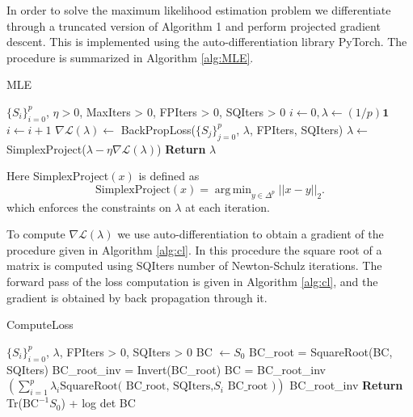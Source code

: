\documentclass[nohyperref]{article}
\DeclareMathOperator*{\argmin}{arg\,min}
\theoremstyle{definition}
\begin{document}
In order to solve the maximum likelihood estimation problem we differentiate through a truncated version of \citep{chewi2020gradient} Algorithm 1 and perform projected gradient descent. This is implemented using the auto-differentiation library PyTorch. The procedure is summarized in Algorithm \ref{alg:MLE}.
\begin{algorithm} 
\caption{MLE}\label{alg:MLE}
\begin{algorithmic}
 $\{S_i\}_{i=0}^p$, $\eta > 0$, MaxIters > 0, FPIters > 0, SQIters > 0 
\STATE $i \leftarrow 0, \lambda  \leftarrow (1/p)\bm{1}$
    \STATE $i \leftarrow i + 1$ 
    \STATE $\nabla \mathcal{L}(\lambda) \leftarrow $ BackPropLoss($\{S_j\}_{j=0}^p$, $\lambda$, FPIters, SQIters)
    \STATE $\lambda \leftarrow $ SimplexProject($\lambda - \eta \nabla \mathcal{L}(\lambda)$)
\ENDWHILE
\STATE \textbf{Return} $\lambda$
\end{algorithmic}
\end{algorithm}
Here SimplexProject$(x)$ is defined as 
$$\text{SimplexProject}(x) = \argmin_{y \in \Delta^p} ||x - y||_2.$$
which enforces the constraints on $\lambda$ at each iteration.

To compute $\nabla \mathcal{L}(\lambda)$ we use auto-differentiation to obtain a gradient of the procedure given in Algorithm \ref{alg:cl}. In this procedure the square root of a matrix is computed using SQIters number of Newton-Schulz iterations. The forward pass of the loss computation is given in Algorithm \ref{alg:cl}, and the gradient is obtained by back propagation through it.
\begin{algorithm} 
\caption{ComputeLoss} \label{alg:cl}
\begin{algorithmic}
 $\{S_i\}_{i=0}^p$, $\lambda$, FPIters > 0, SQIters > 0
\STATE BC $\leftarrow S_0$ 
    \STATE BC\_root = SquareRoot(BC, SQIters) 
    \STATE  BC\_root\_inv = Invert(BC\_root) 
    \STATE BC = BC\_root\_inv $ \left ( \sum_{i=1}^p \lambda_i \text{SquareRoot( BC\_root, SQIters,} S_i \text{  BC\_root } ) \right )$ BC\_root\_inv 
\ENDFOR
\STATE \textbf{Return} Tr($\text{BC}^{-1}S_0$) + log det BC 
\end{algorithmic}
\end{algorithm}
\end{document}
